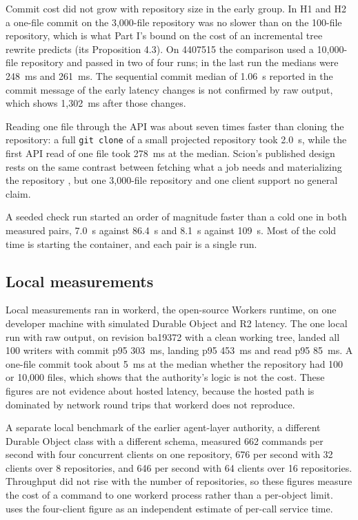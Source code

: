\documentclass[11pt,letterpaper]{article}
\theoremstyle{definition}
\theoremstyle{remark}
\begin{document}
Commit cost did not grow with repository size in the early group. In H1 and H2 a one-file commit on the 3,000-file repository was no slower than on the 100-file repository, which is what Part I's bound on the cost of an incremental tree rewrite predicts (its Proposition 4.3). %
On 4407515 the comparison used a 10,000-file repository and passed in two of four runs; in the last run the medians were 248~ms and 261~ms. %
The sequential commit median of 1.06~s reported in the commit message of the early latency changes is not confirmed by raw output, which shows 1,302~ms after those changes. %

Reading one file through the API was about seven times faster than cloning the repository: a full \texttt{git clone} of a small projected repository took 2.0~s, while the first API read of one file took 278~ms at the median. %
Scion's published design rests on the same contrast between fetching what a job needs and materializing the repository \cite{anthropic2026scion}, but one 3,000-file repository and one client support no general claim.

A seeded check run started an order of magnitude faster than a cold one in both measured pairs, 7.0~s against 86.4~s and 8.1~s against 109~s. %
Most of the cold time is starting the container, and each pair is a single run.

\subsection{Local measurements}

Local measurements ran in workerd, the open-source Workers runtime, on one developer machine with simulated Durable Object and R2 latency. The one local run with raw output, on revision ba19372 with a clean working tree, landed all 100 writers with commit p95 303~ms, landing p95 453~ms and read p95 85~ms. %
A one-file commit took about 5~ms at the median whether the repository had 100 or 10,000 files, which shows that the authority's logic is not the cost. %
These figures are not evidence about hosted latency, because the hosted path is dominated by network round trips that workerd does not reproduce.

A separate local benchmark of the earlier agent-layer authority, a different Durable Object class with a different schema, measured 662 commands per second with four concurrent clients on one repository, 676 per second with 32 clients over 8 repositories, and 646 per second with 64 clients over 16 repositories. %
Throughput did not rise with the number of repositories, so these figures measure the cost of a command to one workerd process rather than a per-object limit.  uses the four-client figure as an independent estimate of per-call service time.
\end{document}
